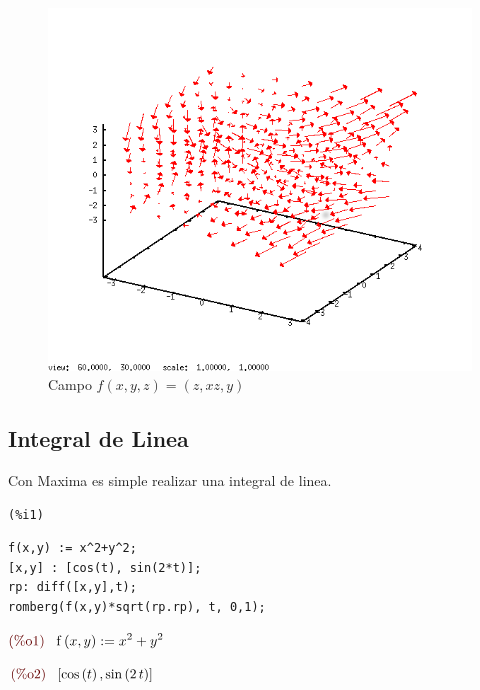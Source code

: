 \documentclass[12pt]{article}
\begin{document}
\begin{figure}[H]
\centering
\includegraphics[scale=0.65]{11.png}
\caption{Campo $f(x,y,z)= (z,xz,y)$ }
\end{figure}
 
\subsection{Integral de Linea}
Con Maxima es simple realizar una integral de linea.

\noindent
\begin{minipage}[t]{8ex}{\color{red}\bf
\begin{verbatim}
(%i1) 
\end{verbatim}}
\end{minipage}
\begin{minipage}[t]{\textwidth}{\color{blue}
\begin{verbatim}
f(x,y) := x^2+y^2;
[x,y] : [cos(t), sin(2*t)];
rp: diff([x,y],t);
romberg(f(x,y)*sqrt(rp.rp), t, 0,1);
\end{verbatim}}
\end{minipage}
\begin{math}\displaystyle
\parbox{8ex}{\color{labelcolor}(\%o1) }
\mathrm{f}\left( x,y\right) :={x}^{2}+{y}^{2}
\end{math}

\begin{math}\displaystyle
\parbox{8ex}{\color{labelcolor}(\%o2) }
[\mathrm{cos}\left( t\right) ,\mathrm{sin}\left( 2\,t\right) ]
\end{math}
\end{document}
